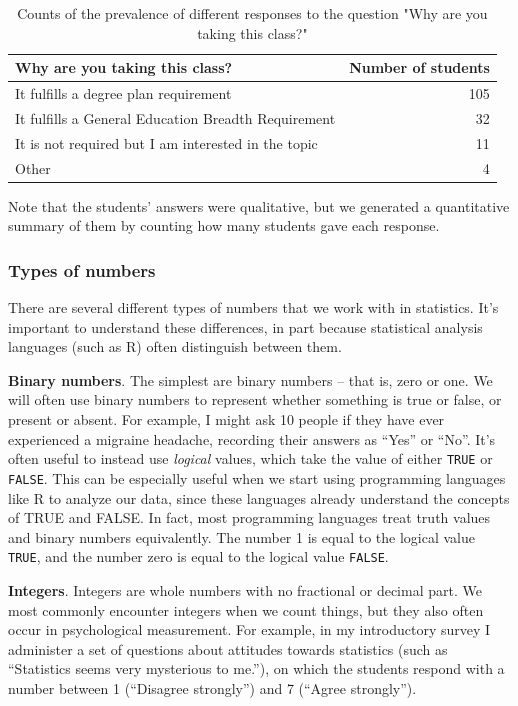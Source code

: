 \documentclass[
  12pt,
]{book}
\begin{document}
\begin{table}

\caption{\label{tab:WhyTakingClass}Counts of the prevalence of different responses to the question "Why are you taking this class?"}
\centering
\begin{tabular}[t]{lr}
\toprule
Why are you taking this class? & Number of students\\
\midrule
It fulfills a degree plan requirement & 105\\
It fulfills a General Education Breadth Requirement & 32\\
It is not required but I am interested in the topic & 11\\
Other & 4\\
\bottomrule
\end{tabular}
\end{table}

Note that the students' answers were qualitative, but we generated a quantitative summary of them by counting how many students gave each response.

\hypertarget{types-of-numbers}{%
\subsubsection{Types of numbers}\label{types-of-numbers}}

There are several different types of numbers that we work with in statistics. It's important to understand these differences, in part because statistical analysis languages (such as R) often distinguish between them.

\textbf{Binary numbers}. The simplest are binary numbers -- that is, zero or one. We will often use binary numbers to represent whether something is true or false, or present or absent. For example, I might ask 10 people if they have ever experienced a migraine headache, recording their answers as ``Yes'' or ``No''. It's often useful to instead use \emph{logical} values, which take the value of either \texttt{TRUE} or \texttt{FALSE}. This can be especially useful when we start using programming languages like R to analyze our data, since these languages already understand the concepts of TRUE and FALSE. In fact, most programming languages treat truth values and binary numbers equivalently. The number 1 is equal to the logical value \texttt{TRUE}, and the number zero is equal to the logical value \texttt{FALSE}.

\textbf{Integers}. Integers are whole numbers with no fractional or decimal part. We most commonly encounter integers when we count things, but they also often occur in psychological measurement. For example, in my introductory survey I administer a set of questions about attitudes towards statistics (such as ``Statistics seems very mysterious to me.''), on which the students respond with a number between 1 (``Disagree strongly'') and 7 (``Agree strongly'').
\end{document}
